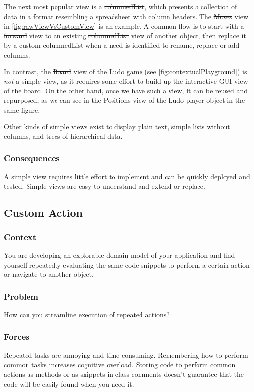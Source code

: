 \documentclass[sigconf]{acmart}
\begin{document}
The next most popular view is a \st{columnedList}, which presents a collection of data in a format resembling a spreadsheet with column headers.
The \st{Moves} view in \autoref{fig:rawViewVsCustomView} is an example.
A common flow is to start with a \st{forward} view to an existing \st{columnedList} view of another object, then replace it by a custom \st{columnedList} when a need is identified to rename, replace or add columns.

In contrast, the \st{Board} view of the Ludo game (see \autoref{fig:contextualPlayground}) is \emph{not} a simple view, as it requires some effort to build up the interactive GUI view of the board.
On the other hand, once we have such a view, it can be reused and repurposed, as we can see in the \st{Positions} view of the Ludo player object in the same figure.

Other kinds of simple views exist to display plain text, simple lists without columns, and trees of hierarchical data.

\subsubsection*{Consequences}
A simple view requires little effort to implement and can be quickly deployed and tested.
Simple views are easy to understand and extend or replace.

\subsection*{Custom Action}\label{pat:customAction}
\subsubsection*{Context}
You are developing an explorable domain model of your application and find yourself repeatedly evaluating the same code snippets to perform a certain action or navigate to another object.

\subsubsection*{Problem}
How can you streamline execution of repeated actions?

\subsubsection*{Forces}
Repeated tasks are annoying and time-consuming.
Remembering how to perform common tasks increases cognitive overload.
Storing code to perform common actions as methods or as snippets in class comments doesn't guarantee that the code will be easily found when you need it.
\end{document}
